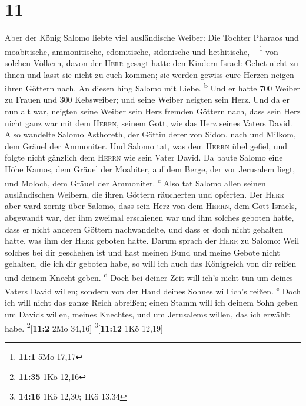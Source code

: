 \hypertarget{section-10}{%
\section{11}\label{section-10}}

 Aber der König Salomo liebte viel ausländische Weiber:
Die Tochter Pharaos und moabitische, ammonitische, edomitische,
sidonische und hethitische, -- \footnote{\textbf{11:1} 5Mo 17,17}
 von solchen Völkern, davon der \textsc{Herr} gesagt hatte
den Kindern Israel: Gehet nicht zu ihnen und lasst sie nicht zu euch
kommen; sie werden gewiss eure Herzen neigen ihren Göttern nach. An
diesen hing Salomo mit Liebe. \textsuperscript{b}  Und er
hatte 700 Weiber zu Frauen und 300 Kebsweiber; und seine Weiber neigten
sein Herz.  Und da er nun alt war, neigten seine Weiber
sein Herz fremden Göttern nach, dass sein Herz nicht ganz war mit dem
\textsc{Herrn}, seinem Gott, wie das Herz seines Vaters David.
 Also wandelte Salomo Asthoreth, der Göttin derer von
Sidon, nach und Milkom, dem Gräuel der Ammoniter.  Und
Salomo tat, was dem \textsc{Herrn} übel gefiel, und folgte nicht
gänzlich dem \textsc{Herrn} wie sein Vater David.  Da
baute Salomo eine Höhe Kamos, dem Gräuel der Moabiter, auf dem Berge,
der vor Jerusalem liegt, und Moloch, dem Gräuel der Ammoniter.
\textsuperscript{c}  Also tat Salomo allen seinen
ausländischen Weibern, die ihren Göttern räucherten und opferten.
 Der \textsc{Herr} aber ward zornig über Salomo, dass sein
Herz von dem \textsc{Herrn}, dem Gott Israels, abgewandt war, der ihm
zweimal erschienen war  und ihm solches geboten hatte,
dass er nicht anderen Göttern nachwandelte, und dass er doch nicht
gehalten hatte, was ihm der \textsc{Herr} geboten hatte. 
Darum sprach der \textsc{Herr} zu Salomo: Weil solches bei dir geschehen
ist und hast meinen Bund und meine Gebote nicht gehalten, die ich dir
geboten habe, so will ich auch das Königreich von dir reißen und deinem
Knecht geben. \textsuperscript{d}  Doch bei deiner Zeit
will ich's nicht tun um deines Vaters David willen; sondern von der Hand
deines Sohnes will ich's reißen. \textsuperscript{e} 
Doch ich will nicht das ganze Reich abreißen; einen Stamm will ich
deinem Sohn geben um Davids willen, meines Knechtes, und um Jerusalems
willen, das ich erwählt habe. \footnote{\textbf{11:35} 1Kö 12,16}{[}\textbf{11:2}
2Mo 34,16{]} \footnote{\textbf{14:16} 1Kö 12,30; 1Kö 13,34}{[}\textbf{11:12}
1Kö 12,19{]}

